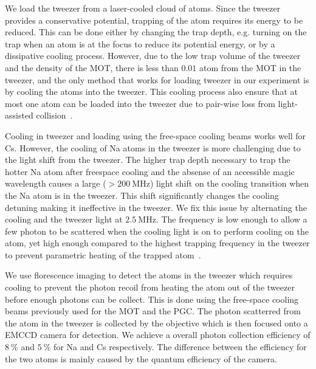 We load the tweezer from a laser-cooled cloud of atoms.
Since the tweezer provides a conservative potential,
trapping of the atom requires its energy to be reduced.
This can be done either by changing the trap depth,
e.g. turning on the trap when an atom is at the focus to reduce its potential energy,
or by a dissipative cooling process.
However, due to the low trap volume of the tweezer and the density of the MOT,
there is less than $0.01$ atom from the MOT in the tweezer,
and the only method that works for loading tweezer in our experiment
is by cooling the atoms into the tweezer.
This cooling process also ensure that at most one atom can be loaded into the tweezer
due to pair-wise loss from light-assisted collision~\cite{schlosser_sub-poissonian_2001}.

Cooling in tweezer and loading using the free-space cooling beams works well for Cs.
However, the cooling of Na atoms in the tweezer is more challenging
due to the light shift from the tweezer.
The higher trap depth necessary to trap the hotter Na atom after freespace cooling
and the absense of an accessible magic wavelength causes a large ($>\!200~\mathrm{MHz}$)
light shift on the cooling transition when the Na atom is in the tweezer.
This shift significantly changes the cooling detuning making it ineffective in the tweezer.
We fix this issue by alternating the cooling and the tweezer light at $2.5~\mathrm{MHz}$.
The frequency is low enough to allow a few photon to be scattered
when the cooling light is on to perform cooling on the atom,
yet high enough compared to the highest trapping frequency in the tweezer
to prevent parametric heating of the trapped atom~\cite{hutzler_eliminating_2017}.

We use florescence imaging to detect the atoms in the tweezer
which requires cooling to prevent the photon recoil from heating the atom out of the tweezer
before enough photons can be collect.
This is done using the free-space cooling beams previously used for the MOT and the PGC.
The photon scatterred from the atom in the tweezer is collected by the objective
which is then focused onto a EMCCD camera for detection.
We achieve a overall photon collection efficiency of $8~\mathrm{\%}$ and $5~\mathrm{\%}$
for Na and Cs respectively.
The difference between the efficiency for the two atoms
is mainly caused by the quantum efficiency of the camera.

